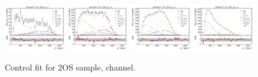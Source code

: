 \begin{figure}[htb]
    \includegraphics[width=0.24\textwidth]{./figs-fit-fit-results/ctrl-fit/lines_q2_slices/fit_result-lines_q2_idx1-D0-2os-el.pdf}
    \includegraphics[width=0.24\textwidth]{./figs-fit-fit-results/ctrl-fit/lines_q2_slices/fit_result-lines_q2_idx2-D0-2os-el.pdf}
    \includegraphics[width=0.24\textwidth]{./figs-fit-fit-results/ctrl-fit/lines_q2_slices/fit_result-lines_q2_idx3-D0-2os-el.pdf}
    \includegraphics[width=0.24\textwidth]{./figs-fit-fit-results/ctrl-fit/lines_q2_slices/fit_result-lines_q2_idx4-D0-2os-el.pdf}

    \caption{Control fit for 2OS sample, \Dz channel.}
    \label{fig:ctrl-2os-d0}
\end{figure}

